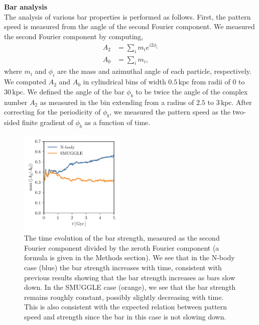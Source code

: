 \documentclass{natureprintstyle}
\begin{document}
\noindent
{\bf Bar analysis}
\\
\noindent
The analysis of various bar properties is performed as follows. First, the
pattern speed is measured from the angle of the second Fourier component. We
measured the second Fourier component by computing,
\begin{equation}
\begin{split}
A_2 &= \sum_i m_i e^{i 2 \phi_i} \\
A_0 &= \sum_i m_i \textrm{,}
\end{split}
\end{equation}
where $m_i$ and $\phi_i$ are the mass and azimuthal angle of each particle,
respectively. We computed $A_2$ and $A_0$ in cylindrical bins of width
$0.5\,\textrm{kpc}$ from radii of $0$ to $30\,\textrm{kpc}$. We defined the
angle of the bar $\phi_b$ to be twice the angle of the complex number $A_2$ as
measured in the bin extending from a radius of $2.5$ to $3\,\textrm{kpc}$.
After correcting for the periodicity of $\phi_b$, we measured the pattern
speed as the two-sided finite gradient of $\phi_b$ as a function of time.

\begin{figure}[t!]%
\centering
\includegraphics[width=0.45\textwidth]{fig/fig-A2.pdf}
\caption{The time evolution of the bar strength, measured as the second
Fourier component divided by the zeroth Fourier component (a formula is given
in the Methods section). We see that in the N-body case (blue) the bar
strength increases with time, consistent with previous results showing that
the bar strength increases as bars slow down. In the SMUGGLE case (orange), we
see that the bar strength remains roughly constant, possibly slightly
decreasing with time. This is also consistent with the expected relation
between pattern speed and strength since the bar in this case is not slowing
down.}
\label{fig:strength}
\end{figure}
\end{document}
